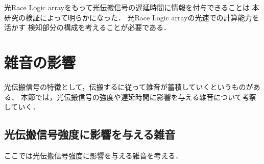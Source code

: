 光Race Logic arrayをもって光伝搬信号の遅延時間に情報を付与できることは
本研究の検証によって明らかになった．
光Race Logic arrayの光速での計算能力を活かす
検知部分の構成を考えることが必要である．

\section{雑音の影響}
光伝搬信号の特徴として，伝搬するに従って雑音が蓄積していくというものがある．
本節では，光伝搬信号の強度や遅延時間に影響を与える雑音について考察していく．
\subsection{光伝搬信号強度に影響を与える雑音}
ここでは光伝搬信号強度に影響を与える雑音を考える．

